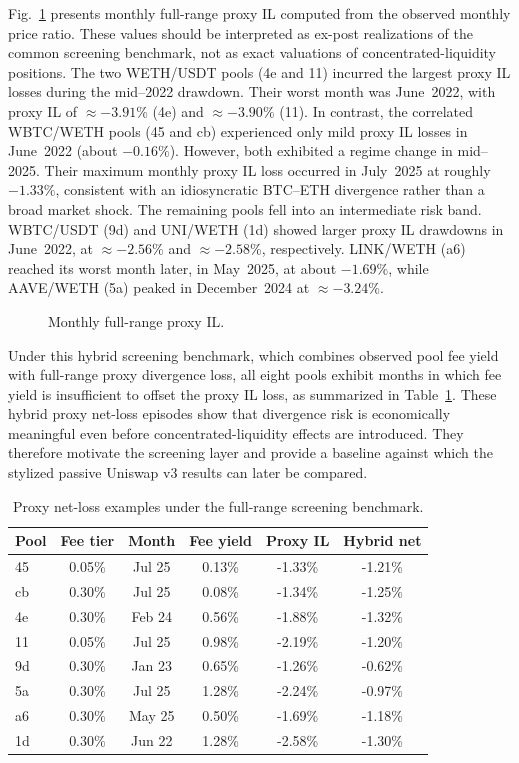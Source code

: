 \documentclass[anonymous]{lipics-v2021}
\begin{document}
{Fig.~\ref{fig:monthly_il} presents monthly full-range proxy IL computed from the observed monthly price ratio. These values should be interpreted as ex-post realizations of the common screening benchmark, not as exact valuations of concentrated-liquidity positions.
The two WETH/USDT pools (4e and 11) incurred the largest proxy IL losses during the mid--2022 drawdown. 
Their worst month was June~2022, with proxy IL of $\approx-3.91\%$ (4e) and $\approx-3.90\%$ (11).
In contrast, the correlated WBTC/WETH pools (45 and cb) experienced only mild proxy IL losses in June~2022 (about $-0.16\%$). 
However, both exhibited a regime change in mid--2025. 
Their maximum monthly proxy IL loss occurred in July~2025 at roughly $-1.33\%$, consistent with an idiosyncratic BTC--ETH divergence rather than a broad market shock.
The remaining pools fell into an intermediate risk band. 
WBTC/USDT (9d) and UNI/WETH (1d) showed larger proxy IL drawdowns in June~2022, at $\approx-2.56\%$ and $\approx-2.58\%$, respectively. 
LINK/WETH (a6) reached its worst month later, in May~2025, at about $-1.69\%$, while AAVE/WETH (5a) peaked in December~2024 at $\approx-3.24\%$.

\begin{figure}[t]
  \centering
        
  \caption{Monthly full-range proxy IL.}
  \label{fig:monthly_il}
\end{figure}

Under this hybrid screening benchmark, which combines observed pool fee yield with full-range proxy divergence loss, all eight pools exhibit months in which fee yield is insufficient to offset the proxy IL loss, as summarized in Table~\ref{tab:worst_net_loss}. These hybrid proxy net-loss episodes show that divergence risk is economically meaningful even before concentrated-liquidity effects are introduced. They therefore motivate the screening layer and provide a baseline against which the stylized passive Uniswap v3 results can later be compared.

\begin{table}[b]
\centering
\footnotesize
\begin{tabular}{lccccc}
\toprule
Pool & Fee tier & Month & Fee yield & Proxy IL & Hybrid net \\
\midrule
45 & 0.05\% & Jul 25 & 0.13\% & -1.33\% & -1.21\% \\
cb & 0.30\% & Jul 25 & 0.08\% & -1.34\% & -1.25\% \\
4e & 0.30\% & Feb 24 & 0.56\% & -1.88\% & -1.32\% \\
11 & 0.05\% & Jul 25 & 0.98\% & -2.19\% & -1.20\% \\
9d & 0.30\% & Jan 23 & 0.65\% & -1.26\% & -0.62\% \\
5a & 0.30\% & Jul 25 & 1.28\% & -2.24\% & -0.97\% \\
a6 & 0.30\% & May 25 & 0.50\% & -1.69\% & -1.18\% \\
1d & 0.30\% & Jun 22 & 1.28\% & -2.58\% & -1.30\% \\
\bottomrule
\end{tabular}
\caption{Proxy net-loss examples under the full-range screening benchmark.}
\label{tab:worst_net_loss}
\end{table}

}
\end{document}
